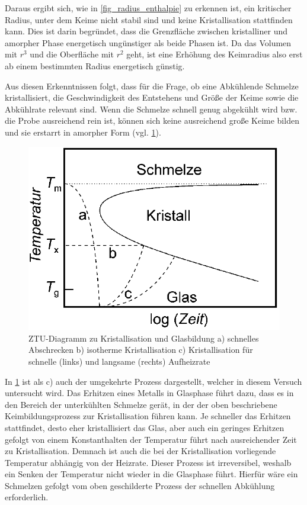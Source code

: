 \documentclass[
	a4paper,
	12pt,
	pagesize,
	ngerman
]{scrartcl}
\begin{document}
	Daraus ergibt sich, wie in \cref{fig_radius_enthalpie} zu erkennen ist, ein kritischer Radius, unter dem Keime nicht stabil sind und keine Kristallisation stattfinden kann.
	Dies ist darin begründet, dass die Grenzfläche zwischen kristalliner und amorpher Phase energetisch ungünstiger als beide Phasen ist.
	Da das Volumen mit $r^3$ und die Oberfläche mit $r^2$ geht, ist eine Erhöhung des Keimradius also erst ab einem bestimmten Radius energetisch günstig.

	Aus diesen Erkenntnissen folgt, dass für die Frage, ob eine Abkühlende Schmelze kristallisiert, die Geschwindigkeit des Entstehens und Größe der Keime sowie die Abkühlrate relevant sind.
	Wenn die Schmelze schnell genug abgekühlt wird bzw. die Probe ausreichend rein ist, können sich keine ausreichend große Keime bilden und sie erstarrt in amorpher Form (vgl. \cref{fig_kristallisierung}).

	\begin{figure}[H]
			\includegraphics[width= 0.7 \linewidth]{img/kristallisierung}
			\caption{
			ZTU-Diagramm zu Kristallisation und Glasbildung
			a) schnelles Abschrecken
			b) isotherme Kristallisation
			c) Kristallisation für schnelle (links) und langsame (rechts) Aufheizrate
			\cite{anleitung}
			}
			\label{fig_kristallisierung}
	\end{figure}

	In \cref{fig_kristallisierung} ist als c) auch der umgekehrte Prozess dargestellt, welcher in diesem Versuch untersucht wird.
	Das Erhitzen eines Metalls in Glasphase führt dazu, dass es in den Bereich der unterkühlten Schmelze gerät, in der der oben beschriebene Keimbildungsprozess zur Kristallisation führen kann.
	Je schneller das Erhitzen stattfindet, desto eher kristallisiert das Glas, aber auch ein geringes Erhitzen gefolgt von einem Konstanthalten der Temperatur führt nach ausreichender Zeit zu Kristallisation.
	Demnach ist auch die bei der Kristallisation vorliegende Temperatur abhängig von der Heizrate.
	Dieser Prozess ist irreversibel, weshalb ein Senken der Temperatur nicht wieder in die Glasphase führt.
	Hierfür wäre ein Schmelzen gefolgt vom oben geschilderte Prozess der schnellen Abkühlung erforderlich.
\end{document}
